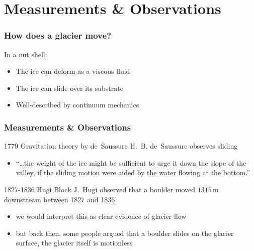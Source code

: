 \documentclass[hide notes,intlimits]{beamer}
\begin{document}

\section{Measurements \& Observations}
 
\begin{frame}
  \frametitle{How does a glacier move?}
  \begin{block}{In a nut shell:}
    \begin{itemize}
    \item The ice can deform as a viscous fluid
    \item The ice can slide over its substrate
    \item Well-described by continuum mechanics
    \end{itemize}
  \end{block}
\end{frame}


\begin{frame}
  \frametitle{Measurements \& Observations}
    \begin{block}{1779 Gravitation theory by de~Saussure}
      H.~B. de~Saussure observes sliding
      \begin{itemize}
        \item ``\ldots the weight of the ice might be sufficient to urge it down the slope of the valley, if the sliding motion were aided by the water flowing at the bottom.''
      \end{itemize}
    \end{block}
    \begin{block}{1827-1836 Hugi Block}
      J.~Hugi observed that a boulder moved $1315\,\text{m}$ downstream between 1827 and 1836
      \begin{itemize}
        \item we would interpret this as clear evidence of glacier flow
        \item but back then, some people argued that a boulder slides on the glacier surface, the glacier itself is motionless
      \end{itemize}
    \end{block}
\end{frame}
\end{document}

